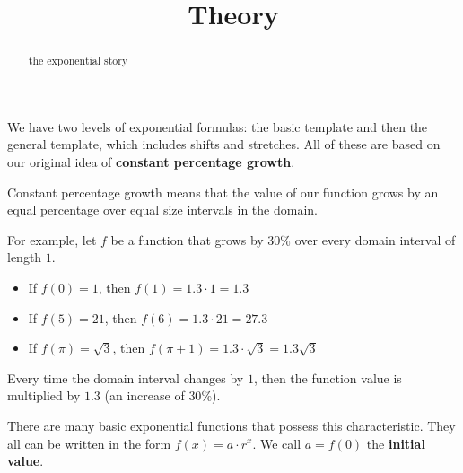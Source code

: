 \documentclass{ximera}
\title{Theory}
\begin{document}
\begin{abstract}
the exponential story
\end{abstract}
\maketitle





We have two levels of exponential formulas: the basic template and then the general template, which includes shifts and stretches.  All of these are based on our original idea of \textbf{\textcolor{purple!85!blue}{constant percentage growth}}.


Constant percentage growth means that the value  of our function grows by an equal percentage over equal size intervals in the domain.



For example, let $f$ be a function that grows by $30\%$ over every domain interval of length $1$. \\


\begin{itemize}
\item If $f(0) = 1$, then $f(1) = 1.3 \cdot 1 = 1.3$
\item If $f(5) = 21$, then $f(6) = 1.3 \cdot 21 = 27.3$
\item If $f(\pi) = \sqrt{3}$, then $f(\pi + 1) = 1.3 \cdot \sqrt{3} = 1.3 \sqrt{3}$
\end{itemize}

Every time the domain interval changes by $1$, then the function value is multiplied by $1.3$ (an increase of $30\%$).




There are many basic exponential functions that possess this characteristic. They all can be written in the form \textbf{\textcolor{blue!55!black}{$f(x) = a \cdot r^x$}}. We call \textbf{\textcolor{purple!85!blue}{$a=f(0)$}} the \textbf{\textcolor{purple!85!blue}{initial value}}.
\end{document}
